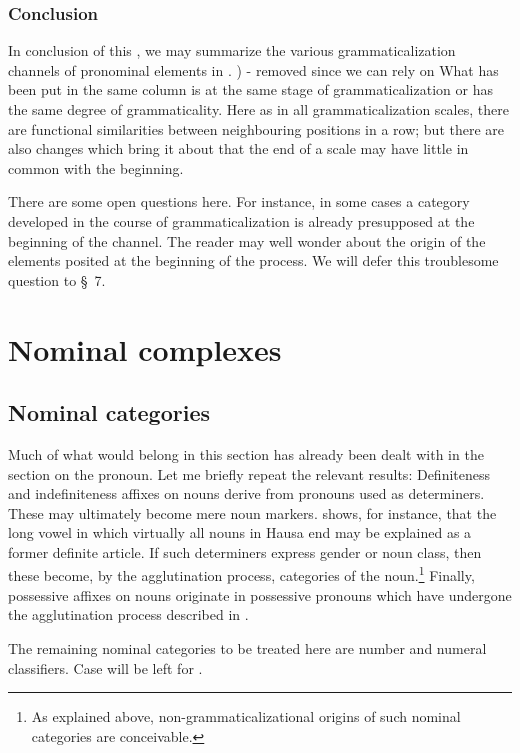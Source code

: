\subsubsection{Conclusion}
In conclusion of this , we may summarize the various grammaticalization channels of pronominal elements in .
) - removed since we can rely on \figref
What has been put in the same column is at the same stage of grammaticalization or has the same degree of grammaticality. Here as in all grammaticalization scales, there are functional similarities between neighbouring positions in a row; but there are also changes which bring it about that the end of a scale may have little in common with the beginning.

There are some open questions here. For instance, in some cases a category developed in the course of grammaticalization is already presupposed at the beginning of the channel. The reader may well wonder about the origin of the elements posited at the beginning of the process. We will defer this troublesome question to §~7.

\section{Nominal complexes}
\subsection{Nominal categories}

Much of what would belong in this section has already been dealt with in the section on the pronoun. Let me briefly repeat the relevant results: Definiteness and indefiniteness affixes on nouns derive from pronouns used as determiners. These may ultimately become mere noun markers.\label{page59} \citet[§~5.3]{Greenberg1978} shows, for instance, that the long vowel in which virtually all nouns in Hausa end may be explained as a former definite article. If such determiners express gender or noun class, then these become, by the agglutination process, categories of the noun.\footnote{As explained above, non-grammaticalizational origins of such nominal categories are conceivable.} Finally, possessive affixes on nouns originate in possessive pronouns which have undergone the agglutination process described in .

The remaining nominal categories to be treated here are number and numeral classifiers. Case will be left for .

